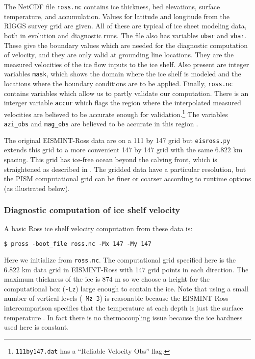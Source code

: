 The NetCDF file \texttt{ross.nc} contains ice thickness, bed elevations, surface temperature, and accumulation.  Values for latitude and longitude from the RIGGS survey grid \cite{RIGGS1} are given.  All of these are typical of ice sheet modeling data, both in evolution and diagnostic runs.  The file also has variables \texttt{ubar} and \texttt{vbar}.  These give the boundary values which are needed for the diagnostic computation of velocity, and they are only valid at grounding line locations.  They are the measured velocities of the ice flow inputs to the ice shelf.  Also present are integer variables \texttt{mask}, which shows the domain where the ice shelf is modeled and the locations where the boundary conditions are to be applied.  Finally, \texttt{ross.nc} contains variables which allow us to partly validate our computation.  There is an interger variable \texttt{accur} which flags the region where the interpolated measured velocities are believed to be accurate enough for validation.\footnote{\texttt{111by147.dat} has a ``Reliable Velocity Obs'' flag.}  The variables \texttt{azi_obs} and \texttt{mag_obs} are believed to be accurate in this region \cite{MacAyealetal}.

The original EISMINT-Ross data are on a 111 by 147 grid but \texttt{eisross.py} extends this grid to a more convenient 147 by 147 grid with the same $6.822$ km spacing.  This grid has ice-free ocean beyond the calving front, which is straightened as described in \cite{MacAyealetal}.  The gridded data have a particular resolution, but the PISM computational grid can be finer or coarser according to runtime options (as illustrated below).

\subsubsection*{Diagnostic computation of ice shelf velocity}  A basic Ross ice shelf velocity computation from these data is:

\begin{verbatim}
$ pross -boot_file ross.nc -Mx 147 -My 147
\end{verbatim}%
Here we initialize from \texttt{ross.nc}. The computational grid specified here is the $6.822$ km data grid in EISMINT-Ross with 147 grid points in each direction.  The maximum thickness of the ice is $874$ m so we choose a height for the computational box (\texttt{-Lz}) large enough to contain the ice.  Note that using a small number of vertical levels (\texttt{-Mz 3}) is reasonable because the EISMINT-Ross intercomparison specifies that the temperature at each depth is just the surface temperature \cite{MacAyealetal}.  In fact there is no thermocoupling issue because the ice hardness used here is constant.

